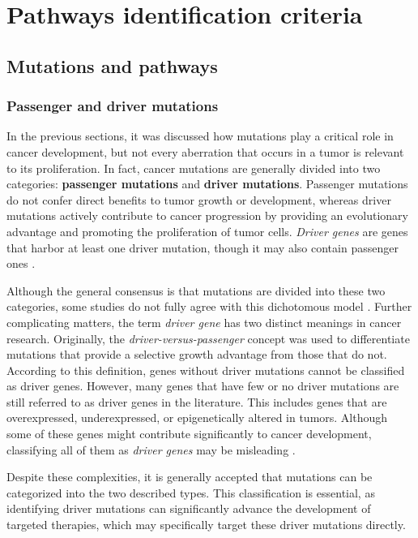 \chapter{Pathways identification criteria} \label{chap:pathways_identification_criteria}

\section{Mutations and pathways}

\subsection{Passenger and driver mutations}

In the previous sections, it was discussed how mutations play a critical role in cancer development, but not every aberration that occurs in a tumor is relevant to its proliferation. In fact, cancer mutations are generally divided into two categories: \textbf{passenger mutations} and \textbf{driver mutations}. Passenger mutations do not confer direct benefits to tumor growth or development, whereas driver mutations actively contribute to cancer progression by providing an evolutionary advantage and promoting the proliferation of tumor cells. \textit{Driver genes} are genes that harbor at least one driver mutation, though it may also contain passenger ones \cite{vogelstein2013}.

Although the general consensus is that mutations are divided into these two categories, some studies do not fully agree with this dichotomous model \cite{three_mutations}. Further complicating matters, the term \textit{driver gene} has two distinct meanings in cancer research. Originally, the \textit{driver-versus-passenger} concept was used to differentiate mutations that provide a selective growth advantage from those that do not. According to this definition, genes without driver mutations cannot be classified as driver genes. However, many genes that have few or no driver mutations are still referred to as driver genes in the literature. This includes genes that are overexpressed, underexpressed, or epigenetically altered in tumors. Although some of these genes might contribute significantly to cancer development, classifying all of them as \textit{driver genes} may be misleading \cite{vogelstein2013}.

Despite these complexities, it is generally accepted that mutations can be categorized into the two described types. This classification is essential, as identifying driver mutations can significantly advance the development of targeted therapies, which may specifically target these driver mutations directly.

